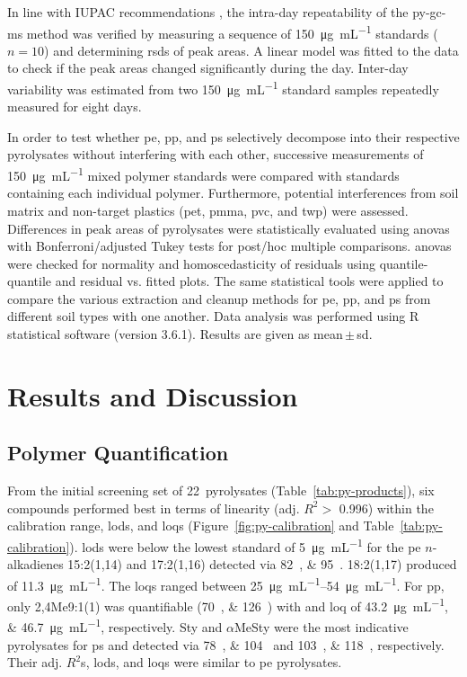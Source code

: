 In line with IUPAC recommendations \citep{CurrieNomenclature1995}, the intra-day repeatability of the \ac{py-gc-ms} method was verified by measuring a sequence of \SI{150}{\micro\gram\per\milli\liter} standards ($n = 10$) and determining \acp{rsd} of peak areas. A linear model was fitted to the data to check if the peak areas changed significantly during the day. Inter-day variability was estimated from two \SI{150}{\micro\gram\per\milli\liter} standard samples repeatedly measured for eight days.

In order to test whether \ac{pe}, \ac{pp}, and \ac{ps} selectively decompose into their respective pyrolysates without interfering with each other, successive measurements of \SI{150}{\micro\gram\per\milli\liter} mixed polymer standards were compared with standards containing each individual polymer. Furthermore, potential interferences from soil matrix and non-target plastics (\ac{pet}, \ac{pmma}, \ac{pvc}, and \ac{twp}) were assessed. Differences in peak areas of pyrolysates were statistically evaluated using \acp{anova} with Bonferroni\-/adjusted Tukey tests for post\-/hoc multiple comparisons. \Acp{anova} were checked for normality and homoscedasticity of residuals using quantile\--quantile and residual vs. fitted plots.
The same statistical tools were applied to compare the various extraction and cleanup methods for \ac{pe}, \ac{pp}, and \ac{ps} from different soil types with one another.
Data analysis was performed using R statistical software (version 3.6.1).
Results are given as mean\,$\pm$\,\ac{sd}.

\section{Results and Discussion}

\subsection{Polymer Quantification}

From the initial screening set of 22~pyrolysates (Table~\ref{tab:py-products}), six compounds performed best in terms of linearity (adj. $R^2 >$ \num{0.996}) within the calibration range, \acp{lod}, and \acp{loq} (Figure~\ref{fig:py-calibration} and Table~\ref{tab:py-calibration}). \Acp{lod} were below the lowest standard of \SI{5}{\micro\gram\per\milli\liter} for the \ac{pe} $n$-alkadienes 15:2(1,14) and 17:2(1,16) detected via \SIlist{82;95}{\mz}. 18:2(1,17) produced  of \SI{11.3}{\micro\gram\per\milli\liter}. The \acp{loq} ranged between \SIrange[range-phrase = { and }]{25}{54}{\micro\gram\per\milli\liter}.
For \ac{pp}, only 2,4Me9:1(1) was quantifiable (\SIlist{70;126}{\mz}) with  and \ac{loq} of \SIlist{43.2;46.7}{\micro\gram\per\milli\liter}, respectively.
Sty and $\alpha$MeSty were the most indicative pyrolysates for \ac{ps} and detected via \SIlist{78;104}{\mz} and \SIlist{103;118}{\mz}, respectively. Their adj. $R^2$s, \acp{lod}, and \acp{loq} were similar to \ac{pe} pyrolysates.

